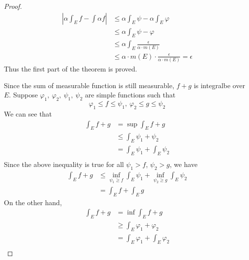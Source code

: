 \documentclass[lang=en, 12pt]{elegantbook}
\begin{document}
\begin{proof}
\begin{equation*}
                \begin{aligned}
                    |\alpha \int_E f - \int \alpha f| &\leq \alpha \int_E \psi - \alpha \int_E \varphi \\
                    &\leq \alpha \int_E \psi - \varphi \\
                    &\leq \alpha \int_E \frac{\epsilon}{\alpha \cdot m(E)}\\
                    &\leq \alpha \cdot m(E) \cdot \frac{\epsilon}{\alpha \cdot m(E)} = \epsilon 
                \end{aligned}
            \end{equation*}
            Thus the first part of the theorem is proved. \par 
                Since the sum of measurable function is still measurable, $f+g$ is integralbe over $E$. Suppose 
            $\varphi_1, \ \varphi_2, \ \psi_1, \ \psi_2$ are simple functions such that 
            $$\varphi_1 \leq f \leq \psi_1, \ \varphi_2 \leq g \leq \psi_2$$
            We can see that 
            \begin{equation*}
                \begin{aligned}
                    \int_E f+ g &= \sup \int_E f+g \\
                    &\leq \int_E \psi_1 + \psi_2\\
                    &= \int_E \psi_1 + \int_E \psi_2\\
                \end{aligned}
            \end{equation*}
            Since the above inequality is true for all $\psi_1 > f$, $\psi_2 > g$, we have 
            \begin{equation*}
                \begin{aligned}
                    \int_E f+ g &\leq \inf_{\psi_1 \geq f}\int_E \psi_1 +  \inf_{\psi_2 \geq g}\int_E \psi_2\\
                    &= \int_E f +\int_E g 
                \end{aligned}
            \end{equation*}
            On the other hand, 
            \begin{equation*}
                \begin{aligned}
                    \int_E f+ g &= \inf \int_E f+g \\
                    &\geq \int_E \varphi_1 + \varphi_2\\
                    &= \int_E \varphi_1 + \int_E \varphi_2\\

\end{aligned}
\end{equation*}
\end{proof}
\end{document}
